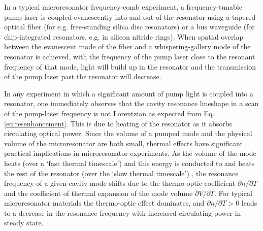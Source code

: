 
In a typical microresonator frequency-comb experiment, a frequency-tunable pump laser is coupled evanescently into and out of the resonator using a tapered optical fiber\cite{Spillane2003} (for e.g. free-standing silica disc resonators) or a bus waveguide (for chip-integrated resonators, e.g. in silicon nitride rings). When spatial overlap between the evanescent mode of the fiber and a whispering-gallery mode of the resonator is achieved, with the frequency of the pump laser close to the resonant frequency of that mode, light will build up in the resonator and the transmission of the pump laser past the resonator will decrease.

In any experiment in which a significant amount of pump light is coupled into a resonator, one immediately observes that the cavity resonance lineshape in a scan of the pump-laser frequency is not Lorentzian as expected from Eq. \ref{eq:resenhancement}. This is due to heating of the resonator as it absorbs circulating optical power. Since the volume of a pumped mode and the physical volume of the microresonator are both small, thermal effects have significant practical implications in microresonator experiments. As the volume of the mode heats (over a `fast thermal timescale') and this energy is conducted to and heats the rest of the resonator (over the `slow thermal timescale') \cite{Ilchenko1992}, the resonance frequency of a given cavity mode shifts due to the thermo-optic coefficient $\partial n/\partial T$ and the coefficient of thermal expansion of the mode volume $\partial V/\partial T$. For typical microresonator materials the thermo-optic effect dominates, and $\partial n/\partial T>0$ leads to a decrease in the resonance frequency with increased circulating power in steady state.

